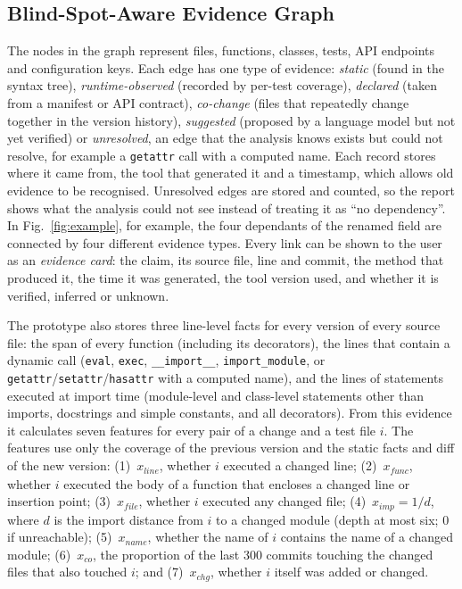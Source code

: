 \documentclass[conference]{IEEEtran}
\begin{document}
\subsection{Blind-Spot-Aware Evidence Graph}
The nodes in the graph represent files, functions, classes, tests, API endpoints and configuration keys. Each edge has one type of evidence: \emph{static} (found in the syntax tree), \emph{runtime-observed} (recorded by per-test coverage), \emph{declared} (taken from a manifest or API contract), \emph{co-change} (files that repeatedly change together in the version history), \emph{suggested} (proposed by a language model but not yet verified) or \emph{unresolved}, an edge that the analysis knows exists but could not resolve, for example a \texttt{getattr} call with a computed name. Each record stores where it came from, the tool that generated it and a timestamp, which allows old evidence to be recognised. Unresolved edges are stored and counted, so the report shows what the analysis could not see instead of treating it as ``no dependency''. In Fig.~\ref{fig:example}, for example, the four dependants of the renamed field are connected by four different evidence types. Every link can be shown to the user as an \emph{evidence card}: the claim, its source file, line and commit, the method that produced it, the time it was generated, the tool version used, and whether it is verified, inferred or unknown.

The prototype also stores three line-level facts for every version of every source file: the span of every function (including its decorators), the lines that contain a dynamic call (\texttt{eval}, \texttt{exec}, \texttt{\_\_import\_\_}, \texttt{import\_module}, or \texttt{getattr}/\texttt{setattr}/\texttt{hasattr} with a computed name), and the lines of statements executed at import time (module-level and class-level statements other than imports, docstrings and simple constants, and all decorators). From this evidence it calculates seven features for every pair of a change and a test file $i$. The features use only the coverage of the previous version and the static facts and diff of the new version: (1)~$x_{\mathit{line}}$, whether $i$ executed a changed line; (2)~$x_{\mathit{func}}$, whether $i$ executed the body of a function that encloses a changed line or insertion point; (3)~$x_{\mathit{file}}$, whether $i$ executed any changed file; (4)~$x_{\mathit{imp}}=1/d$, where $d$ is the import distance from $i$ to a changed module (depth at most six; $0$ if unreachable); (5)~$x_{\mathit{name}}$, whether the name of $i$ contains the name of a changed module; (6)~$x_{\mathit{co}}$, the proportion of the last 300 commits touching the changed files that also touched $i$; and (7)~$x_{\mathit{chg}}$, whether $i$ itself was added or changed.
\end{document}
